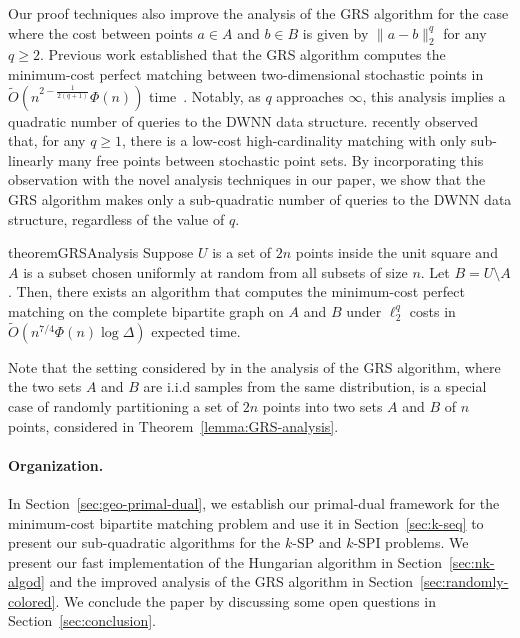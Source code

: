 %
 

%
%

%

Our proof techniques also improve the analysis of the GRS algorithm for the case where the cost between points $a \in A$ and $b \in B$ is given by $\|a-b\|_2^q$ for any $q \ge 2$. Previous work established that the GRS algorithm computes the minimum-cost perfect matching between two-dimensional stochastic points in $\tilde{O}(n^{2-\frac{1}{2(q+1)}}\Phi(n))$ time~\cite{gattani2023robust}. Notably, as $q$ approaches $\infty$, this analysis implies a quadratic number of queries to the DWNN data structure.
\citet{raghvendra2024new} recently observed that, for any $q\ge1$, there is a low-cost high-cardinality matching with only sub-linearly many free points between stochastic point sets. By incorporating this observation with the novel analysis techniques in our paper, we show that the GRS algorithm makes only a sub-quadratic number of queries to the DWNN data structure, regardless of the value of $q$. 
  
%

\begin{restatable}{theorem}{GRSAnalysis}\label{lemma:GRS-analysis}
    Suppose $U$ is a set of $2n$ points inside the unit square and $A$ is a subset chosen uniformly at random from all subsets of size $n$. Let $B=U\setminus A$.  Then, there exists an algorithm that computes the minimum-cost perfect matching on the complete bipartite graph on $A$ and $B$ under $\ell_2^q$ costs in $\tilde{O}(n^{7/4}\Phi(n)\log \Delta)$ expected time.
\end{restatable}

Note that the setting considered by \citet{gattani2023robust} in the analysis of the GRS algorithm, where the two sets $A$ and $B$ are i.i.d samples from the same distribution, is a special case of randomly partitioning a set of $2n$ points into two sets $A$ and $B$ of $n$ points, considered in Theorem~\ref{lemma:GRS-analysis}.


%

%


%



\paragraph{Organization.} In Section~\ref{sec:geo-primal-dual}, we establish our primal-dual framework for the minimum-cost bipartite matching problem and use it in Section~\ref{sec:k-seq} to present our sub-quadratic algorithms for the $k$-SP and $k$-SPI problems. We present our fast implementation of the Hungarian algorithm in Section~\ref{sec:nk-algod} and the improved analysis of the GRS algorithm in Section~\ref{sec:randomly-colored}. We conclude the paper by discussing some open questions in Section~\ref{sec:conclusion}.

